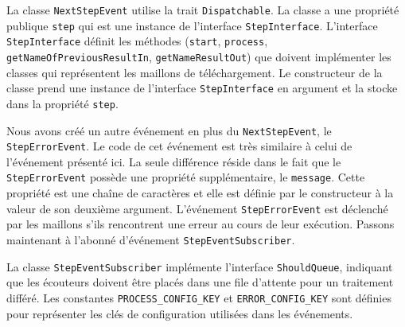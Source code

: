 
La classe \Verb|NextStepEvent| utilise la trait \Verb|Dispatchable|. La classe a une propriété publique \Verb|step| qui est une instance de l'interface \Verb|StepInterface|. L'interface \Verb|StepInterface| définit les méthodes (\verb|start|, \Verb|process|, \Verb|getNameOfPreviousResultIn|, \Verb|getNameResultOut|) que doivent implémenter les classes qui représentent les maillons de téléchargement. Le constructeur de la classe prend une instance de l'interface \Verb|StepInterface| en argument et la stocke dans la propriété \Verb|step|.

Nous avons créé un autre événement en plus du \Verb|NextStepEvent|, le \Verb|StepErrorEvent|. Le code de cet événement est très similaire à celui de l'événement présenté ici. La seule différence réside dans le fait que le \Verb|StepErrorEvent| possède une propriété supplémentaire, le \Verb|message|. Cette propriété est une chaîne de caractères et elle est définie par le constructeur à la valeur de son deuxième argument. L'événement \Verb|StepErrorEvent| est déclenché par les maillons s'ils rencontrent une erreur au cours de leur exécution. Passons maintenant à l'abonné d'événement \Verb|StepEventSubscriber|.

La classe \Verb|StepEventSubscriber| implémente l'interface \Verb|ShouldQueue|, indiquant que les écouteurs doivent être placés dans une file d'attente pour un traitement différé. Les constantes \Verb|PROCESS_CONFIG_KEY| et \Verb|ERROR_CONFIG_KEY| sont définies pour représenter les clés de configuration utilisées dans les événements.

